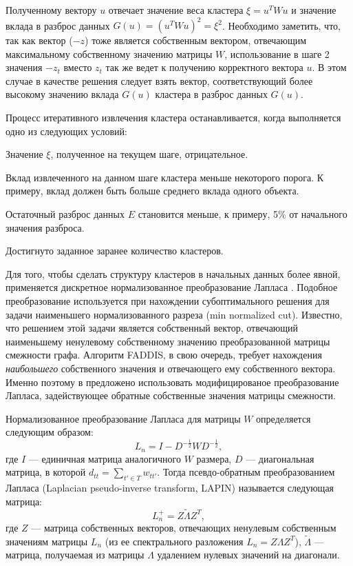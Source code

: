 \documentclass[12pt]{article}
\newenvironment{enumerate*}%
{\begin{enumerate}%
	\setlength{\itemsep}{0pt}%
	\setlength{\parskip}{0pt}}%
{\end{enumerate}}
\begin{document}
Полученному вектору $u$ отвечает значение веса кластера $\xi=u^TWu$ и значение вклада в разброс данных $G(u)=(u^TWu)^2=\xi^2$. Необходимо заметить, что, так как вектор ($-z$) тоже является собственным вектором, отвечающим максимальному собственному значению матрицы $W$, использование в шаге 2 значения $-z_t$ вместо $z_t$ так же ведет к получению корректного вектора $u$. В этом случае в качестве решения следует взять вектор, соответствующий более высокому значению вклада $G(u)$ кластера в разброс данных $G(u)$.

Процесс итеративного извлечения кластера останавливается, когда выполняется одно из следующих условий:
\begin{enumerate*}
	\item\label{enum:faddis_stop_xi_neg} Значение $\xi$, полученное на текущем шаге, отрицательное.
	\item Вклад извлеченного на данном шаге кластера меньше некоторого порога. К примеру, вклад должен быть больше среднего вклада одного объекта.
	\item Остаточный разброс данных $E$ становится меньше, к примеру, 5\% от начального значения разброса.
	\item Достигнуто заданное заранее количество кластеров.
\end{enumerate*}

Для того, чтобы сделать структуру кластеров в начальных данных более явной, применяется дискретное нормализованное преобразование Лапласа \cite{von2007tutorial}. Подобное преобразование используется при нахождении субоптимального решения для задачи наименьшего нормализованного разреза (min normalized cut). Известно, что решением этой задачи является собственный вектор, отвечающий наименьшему ненулевому собственному значению преобразованной матрицы смежности графа. Алгоритм FADDIS, в свою очередь, требует нахождения \emph{наибольшего} собственного значения и отвечающего ему собственного вектора. Именно поэтому в \cite{mirkin2012additive} предложено использовать модифицированое преобразование Лапласа, задействующее обратные собственные значения матрицы смежности. 

Нормализованное преобразование Лапласа для матрицы $W$ определяется следующим образом:
\begin{equation}
	L_n=I-D^{-\frac{1}{2}}WD^{-\frac{1}{2}}, 
\end{equation}
где $I$ --- единичная матрица аналогичного $W$ размера, $D$ --- диагональная матрица, в которой $d_{tt} =\sum_{t'\in T} w_{tt'}$. 
Тогда псевдо-обратным преобразованием Лапласа (Laplacian pseudo-inverse transform, LAPIN) \cite{nascimento2013laplacian} называется следующая матрица:
\begin{equation}
	L_n^+ = Z \tilde{\Lambda} Z^T,
\end{equation}
где $Z$ --- матрица собственных векторов, отвечающих ненулевым собственным значениям матрицы $L_n$ (из ее спектрального разложения $L_n=Z\Lambda Z^T$), $\tilde{\Lambda}$ --- матрица, получаемая из матрицы $\Lambda$ удалением нулевых значений на диагонали.
\end{document}
